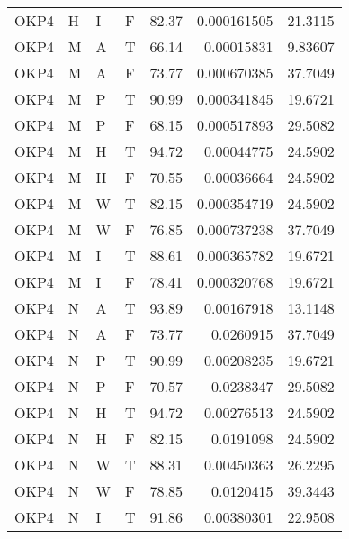 \begin{longtable}{llllrrr}
    OKP4     & H         & I         & F          & 82.37      & 0.000161505 & 21.3115  \\
    OKP4     & M         & A         & T          & 66.14      & 0.00015831  & 9.83607  \\
    OKP4     & M         & A         & F          & 73.77      & 0.000670385 & 37.7049  \\
    OKP4     & M         & P         & T          & 90.99      & 0.000341845 & 19.6721  \\
    OKP4     & M         & P         & F          & 68.15      & 0.000517893 & 29.5082  \\
    OKP4     & M         & H         & T          & 94.72      & 0.00044775  & 24.5902  \\
    OKP4     & M         & H         & F          & 70.55      & 0.00036664  & 24.5902  \\
    OKP4     & M         & W         & T          & 82.15      & 0.000354719 & 24.5902  \\
    OKP4     & M         & W         & F          & 76.85      & 0.000737238 & 37.7049  \\
    OKP4     & M         & I         & T          & 88.61      & 0.000365782 & 19.6721  \\
    OKP4     & M         & I         & F          & 78.41      & 0.000320768 & 19.6721  \\
    OKP4     & N         & A         & T          & 93.89      & 0.00167918  & 13.1148  \\
    OKP4     & N         & A         & F          & 73.77      & 0.0260915   & 37.7049  \\
    OKP4     & N         & P         & T          & 90.99      & 0.00208235  & 19.6721  \\
    OKP4     & N         & P         & F          & 70.57      & 0.0238347   & 29.5082  \\
    OKP4     & N         & H         & T          & 94.72      & 0.00276513  & 24.5902  \\
    OKP4     & N         & H         & F          & 82.15      & 0.0191098   & 24.5902  \\
    OKP4     & N         & W         & T          & 88.31      & 0.00450363  & 26.2295  \\
    OKP4     & N         & W         & F          & 78.85      & 0.0120415   & 39.3443  \\
    OKP4     & N         & I         & T          & 91.86      & 0.00380301  & 22.9508  \\

\end{longtable}
